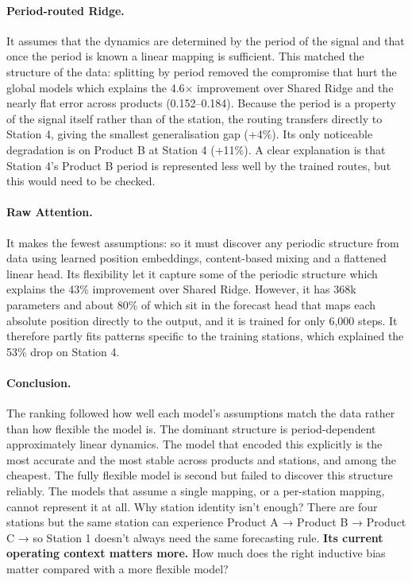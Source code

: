 \documentclass[a4, 12pt]{article}
\begin{document}
\paragraph{Period-routed Ridge.} It assumes that the dynamics are determined by
the period of the signal and that once the period is known a linear mapping is
sufficient. This matched the structure of the data: splitting by period removed the
compromise that hurt the global models which explains the 4.6$\times$ improvement
over Shared Ridge and the nearly flat error across products (0.152--0.184). Because
the period is a property of the signal itself rather than of the station, the
routing transfers directly to Station 4, giving the smallest generalisation gap (+4\%).
Its only noticeable degradation is on Product B at Station 4 (+11\%). A clear
explanation is that Station 4's Product B period is represented less well by the
trained routes, but this would need to be checked.

\paragraph{Raw Attention.} It makes the fewest assumptions: so it must discover any
periodic structure from data using learned position embeddings, content-based
mixing and a flattened linear head. Its flexibility let it capture some of the
periodic structure which explains the 43\% improvement over Shared Ridge. However, it
has 368k parameters and about 80\% of which sit in the forecast head that maps each
absolute position directly to the output, and it is trained for only 6{,}000 steps.
It therefore partly fits patterns specific to the training stations, which explained
the 53\% drop on Station 4. 

\paragraph{Conclusion.} The ranking followed how well each model's assumptions match
the data rather than how flexible the model is. The dominant structure is
period-dependent approximately linear dynamics. The model that encoded this
explicitly is the most accurate and the most stable across products and stations, and
among the cheapest. The fully flexible model is second but failed to discover this
structure reliably. The models that assume a single mapping, or a per-station mapping,
cannot represent it at all.
Why station identity isn't enough?
There are four stations but the same station can experience Product A → Product B → Product C → so Station 1 doesn't always need the same forecasting rule.
\textbf{Its current operating context matters more.} How much does the right inductive bias matter compared with a more flexible model?
\end{document}
